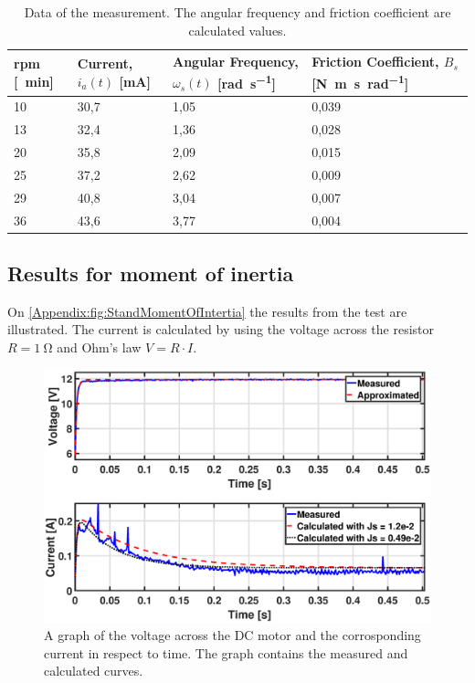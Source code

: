 \begin{table}[!h]
	\centering
	\caption{Data of the measurement. The angular frequency and friction coefficient are calculated values.}\label{tab_appendix:testBs}
	\begin{tabularx}{\textwidth}{lXXX}
		\gls{rpm} [\si{\per\minute}]& Current, $i_a(t)$ [\si{\milli\ampere}]	& Angular Frequency, $\omega_s(t)$ [\si{\radian\per\second}]& Friction Coefficient, $B_s$ [\si{\newton\metre\second\per\radian}]							\\ \toprule \rowcolor{lightGrey}
		10 & 30,7 & 1,05& 0,039	\\
		13	& 32,4 & 1,36 & 0,028\\ \rowcolor{lightGrey}
		20 & 35,8 & 2,09& 0,015 \\
		25 & 37,2 & 2,62& 0,009 \\ \rowcolor{lightGrey}
		29 & 40,8 & 3,04& 0,007 \\
		36 & 43,6 & 3,77& 0,004\\ 
	\end{tabularx}
\end{table}
\subsection*{Results for moment of inertia}
On \autoref{Appendix:fig:StandMomentOfIntertia} the results from the test are illustrated. The current is calculated by using the voltage across the resistor $R=\SI{1}{\ohm}$ and Ohm's law $V = R \cdot I$.
\begin{figure}[!h]
\centering
\includegraphics[width=\textwidth]{figures/test/standJsTest}
\caption{A graph of the voltage across the DC motor and the corrosponding current in respect to time. The graph contains the measured and calculated curves.}\label{Appendix:fig:StandMomentOfIntertia}
\end{figure}

